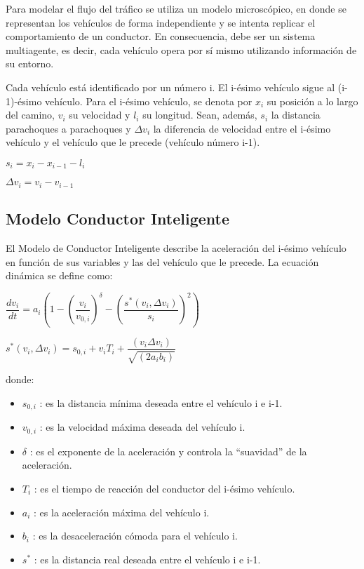 \documentclass[twoside,twocolumn]{article} %
\begin{document}
	Para modelar el flujo del tráfico se utiliza un modelo microscópico, en donde se representan los vehículos de forma independiente y se intenta replicar el comportamiento de un conductor. En consecuencia, debe ser un sistema multiagente, es decir, cada vehículo opera por sí mismo utilizando información de su entorno.
	
	Cada vehículo est\'a identificado por un número i. El i-ésimo vehículo sigue al (i-1)-ésimo vehículo. Para el i-ésimo vehículo, se denota por $ x_{i} $ su posición a lo largo del camino, $ v_{i} $ su velocidad y $ l_{i} $ su longitud. Sean, adem\'as, $ s_{i} $ la distancia parachoques a parachoques y $ \Delta v_{i} $ la diferencia de velocidad entre el i-ésimo vehículo y el vehículo que le precede (vehículo número i-1).
	\begin{center}
		$ s_{i} = x_{i} - x_{i-1} - l_{i} $
	
		$ \Delta v_{i} = v_{i} - v_{i-1} $
	\end{center}
	
	\subsection{Modelo Conductor Inteligente}
	
	El Modelo de Conductor Inteligente describe la aceleración del i-ésimo vehículo en función de sus variables y las del vehículo que le precede. La ecuación dinámica se define como:
	
	\begin{center}
		$  \dfrac{dv_{i}}{dt} = a_{i} \left(1 - \left(\dfrac{v_{i}}{v_{0,i}}\right)^{\delta} - \left(\dfrac{s^{*}(v_{i}, \Delta v_{i})}{s_{i}}\right)^{2}\right)$
		
		\vspace{0.5em}
		$ s^{*}(v_{i}, \Delta v_{i}) =  s_{0,i} + v_{i}T_{i} + \dfrac{(v_{i} \Delta v_{i})}{\sqrt{(2a_{i} b_{i})}}$
	\end{center}
	donde:
	\begin{itemize}
		\item $ s_{0,i} $ : es la distancia mínima deseada entre el vehículo i e i-1.
		\item $ v_{0,i} $ : es la velocidad máxima deseada del vehículo i.
		\item $\delta$ : es el exponente de la aceleración y controla la “suavidad” de la aceleración.
		\item $ T_{i} $  : es el tiempo de reacción del conductor del i-ésimo vehículo.
		\item $ a_{i} $ : es la aceleración máxima del vehículo i.
		\item $ b_{i} $ : es la desaceleración cómoda para el vehículo i.
		\item $ s^{*} $ : es la distancia real deseada entre el vehículo i e i-1.
	\end{itemize}
	
\end{document}
